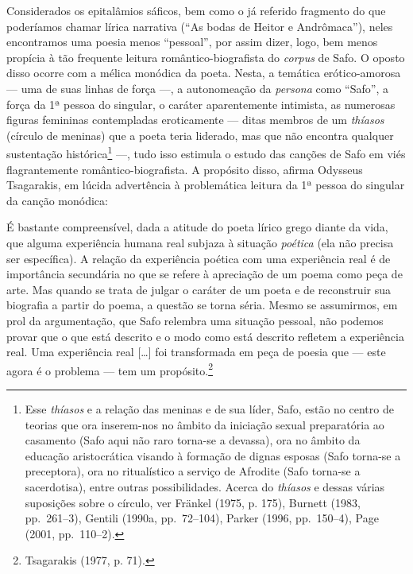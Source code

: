 Considerados os epitalâmios sáficos, bem como o já referido fragmento do que
poderíamos chamar lírica narrativa (“As bodas de Heitor e Andrômaca”), neles
encontramos uma poesia menos “pessoal”, por assim dizer, logo, bem menos
propícia à tão frequente leitura romântico-biografista do \textit{corpus} de
Safo. O oposto disso ocorre com a mélica monódica da poeta. Nesta, a temática
erótico-amorosa --- uma de suas linhas de força ---, a autonomeação da
\textit{persona} como “Safo”, a força da 1ª pessoa do singular, o caráter
aparentemente intimista, as numerosas figuras
femininas contempladas eroticamente --- ditas membros de um \textit{thíasos}
(círculo de meninas) que a poeta teria liderado, mas que não encontra qualquer
sustentação histórica\footnote{ Esse \textit{thíasos} e a relação das meninas e
de sua líder, Safo, estão no centro de teorias que ora inserem-nos no
âmbito da iniciação sexual preparatória ao casamento (Safo aqui não raro
torna-se a devassa), ora no âmbito da educação aristocrática visando à formação
de dignas esposas (Safo torna-se a preceptora), ora no ritualístico a serviço
de Afrodite (Safo torna-se a sacerdotisa), entre outras possibilidades. Acerca
do \textit{thíasos} e dessas várias suposições sobre o círculo, ver Fränkel
(1975, p. 175), Burnett (1983, pp.~261--3), Gentili (1990a, pp.~72--104), Parker
(1996, pp.~150--4), Page (2001, pp.~110--2).} ---, tudo isso estimula o estudo das
canções de Safo em viés flagrantemente romântico-biografista. A propósito
disso, afirma Odysseus Tsagarakis, em lúcida advertência à
problemática leitura da 1ª pessoa do singular da canção
monódica:

\begin{hedraquote}
É bastante compreensível, dada a atitude do poeta lírico grego diante da vida,
que alguma experiência humana real subjaza à situação \textit{poética} (ela não
precisa ser específica). A relação da experiência poética com uma experiência
real é de importância secundária no que se refere à apreciação de um poema como
peça de arte. Mas quando se trata de julgar o caráter de um poeta e de
reconstruir sua biografia a partir do poema, a questão se torna séria. Mesmo se
assumirmos, em prol da argumentação, que Safo relembra uma situação pessoal,
não podemos provar que o que está descrito e o modo como está descrito refletem
a experiência real. Uma experiência real [\ldots{}] foi transformada em peça de
poesia que --- este agora é o problema --- tem um propósito.\footnote{ Tsagarakis (1977, p. 71).}
\end{hedraquote}


